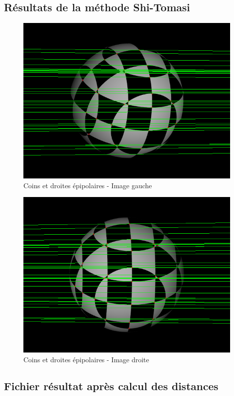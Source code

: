 \documentclass[a4paper]{article}
\begin{document}
\subsection{Résultats de la méthode Shi-Tomasi}
\begin{figure}[h]
\begin{center}
\includegraphics[width=450px]{left-result.png}
\end{center}
\caption{Coins et droites épipolaires - Image gauche}
\end{figure}

\begin{figure}[h]
\begin{center}
\includegraphics[width=450px]{right-result.png}
\end{center}
\caption{Coins et droites épipolaires - Image droite}
\end{figure}

\clearpage
\subsection{Fichier résultat après calcul des distances}


\end{document}
